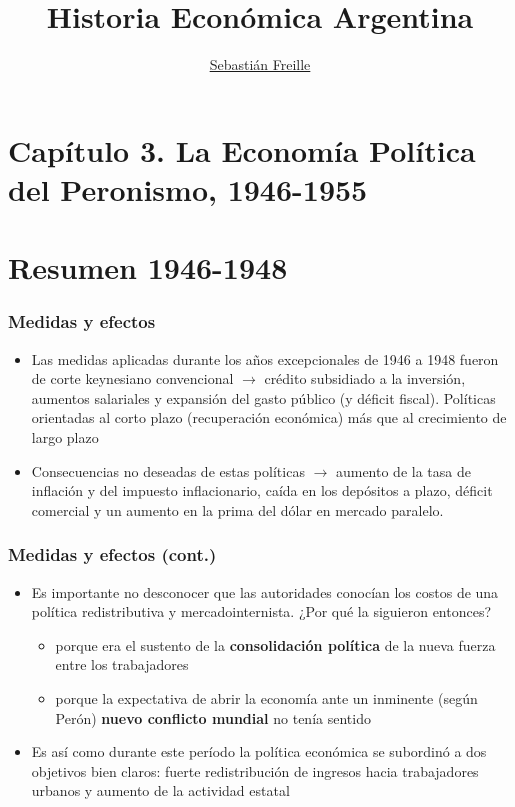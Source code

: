 \documentclass[14pt,aspectratio=169]{beamer}
\title{Historia Económica Argentina}
\author{\underline{Sebastián Freille} \inst{1}}
\institute[shortinst]{\inst{1} IEF-UNC \\ UCC}
\date{}
\begin{document}
{
  \begin{frame}
    \titlepage
  \end{frame}
}

  
  \section{Capítulo 3. La Economía Política del Peronismo, 1946-1955}


  \section{Resumen 1946-1948}
  

 \begin{frame}\frametitle{Medidas y efectos}
    \begin{itemize}\itemsep 10pt
      \item Las medidas aplicadas durante los años excepcionales de
        1946 a 1948 fueron de corte keynesiano convencional
        $\longrightarrow$ crédito subsidiado a la inversión, aumentos
        salariales y expansión del gasto público (y déficit
        fiscal). Políticas orientadas al corto plazo (recuperación
        económica) más que al crecimiento de largo plazo
        \item Consecuencias no deseadas de estas políticas
          $\longrightarrow$ aumento de la tasa de inflación y del
          impuesto inflacionario, caída en los depósitos a plazo,
          déficit comercial y un aumento en la prima del dólar en
          mercado paralelo. 
                 \end{itemize}
               \end{frame}


                \begin{frame}\frametitle{Medidas y efectos (cont.)}
    \begin{itemize}\itemsep 10pt
      \item Es importante no desconocer que las autoridades conocían
        los costos de una política redistributiva y
        mercadointernista. ¿Por qué la siguieron entonces?
        \begin{itemize}\itemsep 5pt \medskip
        \item porque era el sustento de la \textbf{consolidación
            política} de la nueva fuerza entre los trabajadores
          \item porque la expectativa de abrir la economía ante un
            inminente (según Perón)
            \textbf{nuevo conflicto mundial} no tenía sentido 
          \end{itemize}
          \item Es así como durante este período la política económica
            se subordinó a dos objetivos bien claros: fuerte
            redistribución de ingresos hacia trabajadores urbanos y
            aumento de la actividad estatal
                 \end{itemize}
               \end{frame}
\end{document}
